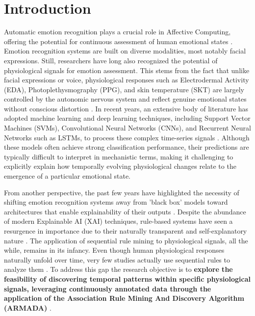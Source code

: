 \documentclass{isd}
\begin{document}
\begin{abstract}
\textbf{Keywords:} Physiological Rule Mining, Emotion Recognition, ARMADA Algorithm, Affective Computing, Cross-Dataset Analysis
\end{abstract}

\section{Introduction}
Automatic emotion recognition plays a crucial role in Affective Computing, offering the potential for continuous assessment of human emotional states \cite{sharma2019dataset}. Emotion recognition systems are built on diverse modalities, most notably facial expressions. Still, researchers have long also recognized the potential of physiological signals for emotion assessment. This stems from the fact that unlike facial expressions or voice, physiological responses such as Electrodermal Activity (EDA), Photoplethysmography (PPG), and skin temperature (SKT) are largely controlled by the autonomic nervous system and reflect genuine emotional states without conscious distortion \cite{shu2018review}. In recent years, an extensive body of literature has adopted machine learning and deep learning techniques, including Support Vector Machines (SVMs), Convolutional Neural Networks (CNNs), and Recurrent Neural Networks such as LSTMs, to process these complex time-series signals \cite{bota2019review}. Although these models often achieve strong classification performance, their predictions are typically difficult to interpret in mechanistic terms, making it challenging to explicitly explain how temporally evolving physiological changes relate to the emergence of a particular emotional state. 

From another perspective, the past few years have highlighted the necessity of shifting emotion recognition systems away from 'black box' models toward architectures that enable explainability of their outputs \cite{gunning2016xai, adadi2018peeking}. Despite the abundance of modern Explainable AI (XAI) techniques, rule-based systems have seen a resurgence in importance due to their naturally transparent and self-explanatory nature \cite{a18090586, rahman2026axai}. The application of sequential rule mining to physiological signals, all the while, remains in its infancy. Even though human physiological responses naturally unfold over time, very few studies actually use sequential rules to analyze them \cite{schneider2025associations}. To address this gap the research objective is to \textbf{explore the feasibility of discovering temporal patterns within specific physiological signals, leveraging continuously annotated data through the application of the Association Rule Mining And Discovery Algorithm (ARMADA)} \cite{winarko2007armada}. 
\end{document}

